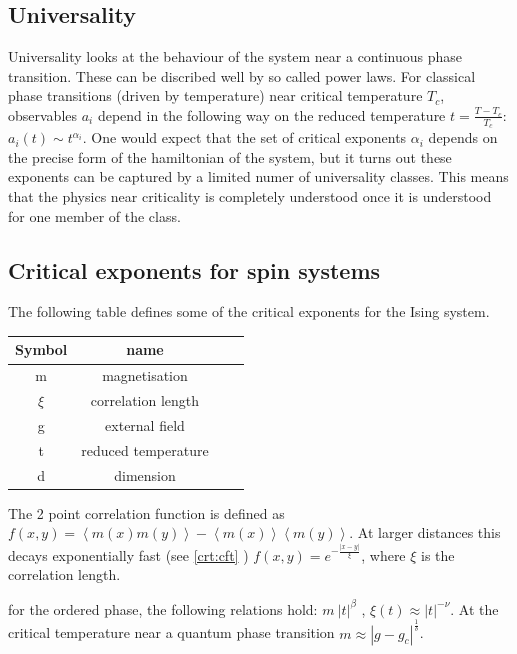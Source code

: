 \subsection{Universality}

Universality looks at the behaviour of the system near a continuous phase transition. These can be discribed well by so called power laws. For classical phase transitions (driven by temperature) near critical temperature $T_c$, observables $a_i$ depend in the following way on the reduced temperature $t=\frac{T-T_c}{T_c}$: $ a_i(t) \sim t^{\alpha_i}$. One would expect that the set of critical exponents ${\alpha_i}$ depends on the precise form of the hamiltonian of the system, but it turns out these exponents can be captured by a limited numer of universality classes. This means that the physics near criticality is completely understood once it is understood for one member of the class.

\subsection{Critical exponents for spin systems}
The following table defines some of the critical exponents for the Ising system.

\begin{table}[h!]
    \centering
    \begin{tabular}{c c c c}
        Symbol & name                \\
        \hline
        m      & magnetisation       \\
        $\xi$  & correlation length  \\
        g      & external field      \\
        t      & reduced temperature \\
        d      & dimension           \\
    \end{tabular}
\end{table}

The 2 point correlation function is defined as $ f( x,y) =  \left < m(x) m(y) \right > -  \left<m(x) \right> \left<m(y) \right> $. At larger distances this decays exponentially fast (see \cref{crt:cft} ) $ f(  x,y ) = e^{ -\frac{ |x-y|}{ \xi} } $, where $\xi$ is the correlation length.

for the ordered phase, the following relations hold: $m ~ |t|^{\beta} $ , $\xi(t) \approx |t|^{-\nu} $. At the critical temperature near a quantum phase transition  $ m \approx |g-g_c|^{\frac{1}{\delta}} $.

